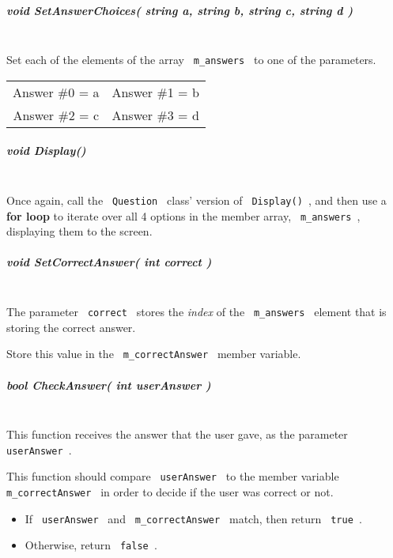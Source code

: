 \documentclass[a4paper,12pt]{book}
\begin{document}
                        
                        \subparagraph{ void SetAnswerChoices( string a, string b, string c, string d ) } ~\\
                            Set each of the elements of the array \texttt{ m\_answers }
                            to one of the parameters. \\

                            \begin{tabular}{ c c }
                                Answer \#0 = a &
                                Answer \#1 = b \\
                                Answer \#2 = c &
                                Answer \#3 = d
                            \end{tabular}
                            
                        \subparagraph{ void Display() } ~\\
                            Once again, call the \texttt{ Question } class' version of
                            \texttt{ Display() }, and then use a \textbf{ for loop }
                            to iterate over all 4 options in the member array,
                            \texttt{ m\_answers }, displaying them to the screen.
                        
                        \subparagraph{ void SetCorrectAnswer( int correct ) } ~\\
                            The parameter \texttt{ correct } stores the \textit{ index }
                            of the \texttt{ m\_answers } element that is storing
                            the correct answer.

                            Store this value in the \texttt{ m\_correctAnswer } member variable.

                        \newpage
                        \subparagraph{ bool CheckAnswer( int userAnswer ) } ~\\

                            This function receives the answer that the user gave,
                            as the parameter \texttt{ userAnswer }.

                            This function should compare \texttt{ userAnswer } to
                            the member variable \texttt{ m\_correctAnswer } in order
                            to decide if the user was correct or not.

                            \begin{itemize}
                                \item If \texttt{ userAnswer } and \texttt{ m\_correctAnswer } match, then return \texttt{ true }.
                                \item Otherwise, return \texttt{ false }.
                            \end{itemize}
                        
\end{document}
